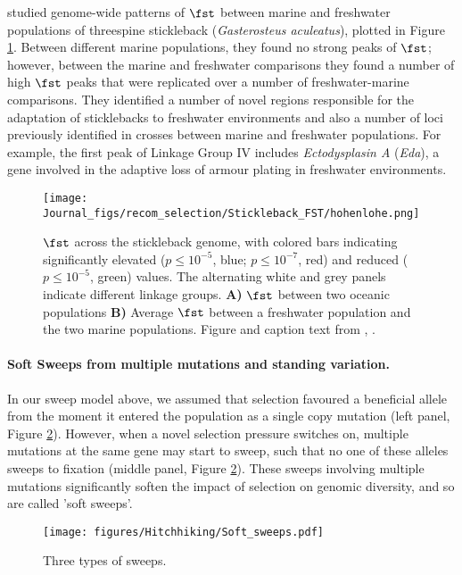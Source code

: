 \citet{hohenlohe2010population} studied genome-wide patterns of
$\fst$ between marine and freshwater populations of  threespine
stickleback ({\it Gasterosteus aculeatus}), plotted in Figure \ref{fig:local_sweep_stickleback}. 
Between different marine populations, they found no strong peaks of $\fst$;
however, between the marine and freshwater comparisons they found a
number of high $\fst$  peaks that were replicated over a number of
freshwater-marine comparisons. They identified a number of novel
regions responsible for the adaptation of sticklebacks to freshwater
environments and also a number of loci previously identified in crosses between marine and freshwater populations. For example, the first peak of Linkage
Group IV includes {\it Ectodysplasin A} ({\it Eda}), a gene involved in the adaptive loss of armour plating in freshwater environments.
\begin{figure}
\begin{center}
\texttt{[image: Journal\_figs/recom\_selection/Stickleback\_FST/hohenlohe.png]}
\end{center}
\caption{$\fst$ across the stickleback genome, with colored bars indicating
  significantly elevated ($p \leq 10^{−5}$, blue; $p \leq 10^{−7}$,
  red) and reduced ($p \leq 10^{−5}$, green) values. The alternating
  white and grey panels indicate different linkage groups. {\bf A)} $\fst$
  between two oceanic populations {\bf B)} Average $\fst$ between a
  freshwater population and the two marine populations. Figure and
  caption text from \citet{hohenlohe2010population}, \PLOSccBY.} \label{fig:local_sweep_stickleback}
\end{figure}


\paragraph{Soft Sweeps from multiple mutations and standing variation.}
In our sweep model above, we assumed that selection favoured a
beneficial allele from the moment it entered the population as a
single copy mutation  (left panel, Figure \ref{fig:soft_sweep_haps}). However, when a novel selection pressure
switches on, multiple mutations at the same gene
may start to sweep, such that no one of these alleles sweeps
to fixation (middle panel, Figure \ref{fig:soft_sweep_haps}). These sweeps involving multiple mutations significantly
soften the impact of selection on genomic diversity, and so are called 'soft sweeps'.

\begin{figure}
\begin{center}
\texttt{[image: figures/Hitchhiking/Soft\_sweeps.pdf]}
\end{center}
\caption{Three types of sweeps. } \label{fig:soft_sweep_haps}
\end{figure}

